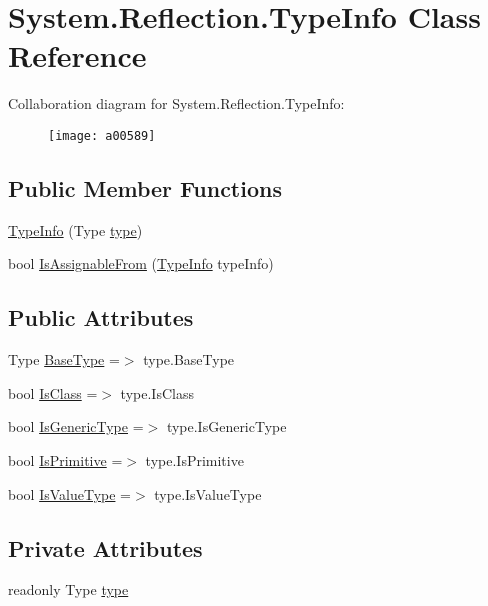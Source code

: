 \hypertarget{a00181}{\section{System.\-Reflection.\-Type\-Info Class Reference}
\label{a00181}
}


Collaboration diagram for System.\-Reflection.\-Type\-Info\-:
\nopagebreak
\begin{figure}[H]
\begin{center}
\leavevmode
\texttt{[image: a00589]}
\end{center}
\end{figure}
\subsection*{Public Member Functions}
\begin{DoxyCompactItemize}
\item 
\hyperlink{a00181_ae2bbf4462c274977b6df5c994808cc39}{Type\-Info} (Type \hyperlink{a00181_a71c4f4b000d08808c8965222d4ba1b8d}{type})
\item 
bool \hyperlink{a00181_a8c74647f572e998dd7e843a752d5234d}{Is\-Assignable\-From} (\hyperlink{a00181}{Type\-Info} type\-Info)
\end{DoxyCompactItemize}
\subsection*{Public Attributes}
\begin{DoxyCompactItemize}
\item 
Type \hyperlink{a00181_a8bb78c2b0377f57dba1a3e2031216029}{Base\-Type} =$>$ type.\-Base\-Type
\item 
bool \hyperlink{a00181_a6ae2d0f4c557010a075a6fecab18fbb5}{Is\-Class} =$>$ type.\-Is\-Class
\item 
bool \hyperlink{a00181_a6a532f6a581b3280d1837fc242f314af}{Is\-Generic\-Type} =$>$ type.\-Is\-Generic\-Type
\item 
bool \hyperlink{a00181_ab38ba26ebc21ec6fb908b74eede99a5c}{Is\-Primitive} =$>$ type.\-Is\-Primitive
\item 
bool \hyperlink{a00181_ae2255904b8743c47a185d62909404aed}{Is\-Value\-Type} =$>$ type.\-Is\-Value\-Type
\end{DoxyCompactItemize}
\subsection*{Private Attributes}
\begin{DoxyCompactItemize}
\item 
readonly Type \hyperlink{a00181_a71c4f4b000d08808c8965222d4ba1b8d}{type}
\end{DoxyCompactItemize}


